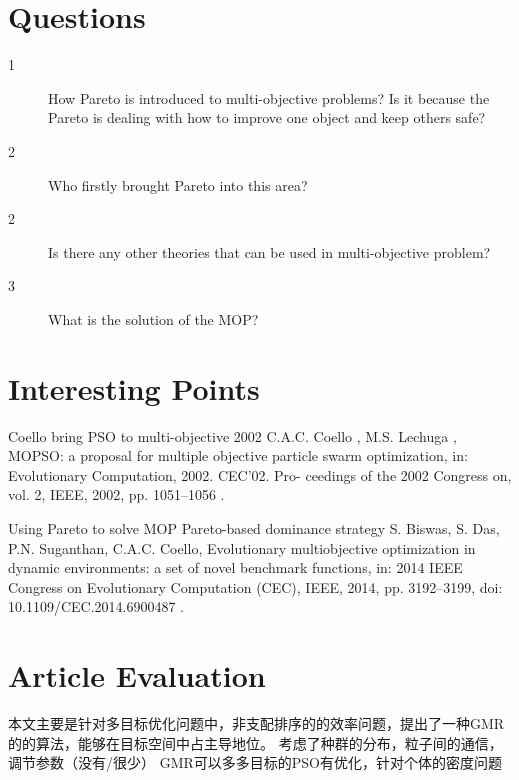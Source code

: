 \documentclass[
10pt, %
a4paper, %
onecolumn, %
portrait %
]{article}
\begin{document}
\begin{CJK*}{UTF8}{gbsn}

\section{Questions} %

\begin{description}
\item[1]  How Pareto is introduced to multi-objective problems? Is it because the Pareto is dealing with how to improve one object and keep others safe? 
\item[2]  Who firstly brought Pareto into this area?
\item[2]  Is there any other theories that can be used in multi-objective problem?
\item[3]  What is the solution of the MOP?


\end{description}


\section{Interesting Points}
 Coello bring PSO to multi-objective 2002
  C.A.C.  Coello  ,  M.S.  Lechuga  ,  MOPSO:  a  proposal  for  multiple  objective  particle  swarm  optimization,  in:  Evolutionary  Computation,  2002.  CEC’02.  Pro- 
 ceedings  of  the  2002  Congress  on,  vol.  2,  IEEE,  2002,  pp.  1051–1056  . 

Using Pareto to solve MOP  Pareto-based dominance strategy 
  S.  Biswas,  S.  Das,  P.N.  Suganthan,  C.A.C.  Coello,  Evolutionary  multiobjective  optimization  in  dynamic  environments:  a  set  of  novel  benchmark  functions, 
 in:  2014  IEEE  Congress  on  Evolutionary  Computation  (CEC),  IEEE,  2014,  pp.  3192–3199,  doi:  10.1109/CEC.2014.6900487  . 






\section*{Article Evaluation}
本文主要是针对多目标优化问题中，非支配排序的的效率问题，提出了一种GMR的的算法，能够在目标空间中占主导地位。
考虑了种群的分布，粒子间的通信，调节参数（没有/很少）
GMR可以多多目标的PSO有优化，针对个体的密度问题


\end{CJK*}
\end{document}
